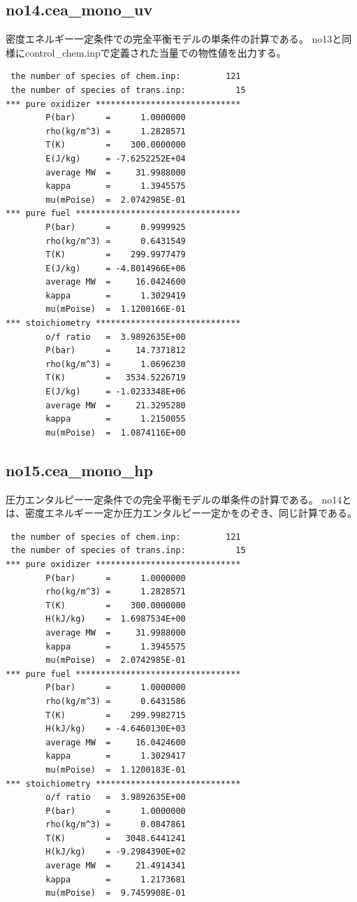 \documentclass{jsarticle}
\begin{document}
\subsection{no14.cea\_mono\_uv}%
密度エネルギー一定条件での完全平衡モデルの単条件の計算である。
no13と同様にcontrol\_chem.inpで定義された当量での物性値を出力する。
\begin{verbatim}
 the number of species of chem.inp:         121
 the number of species of trans.inp:          15
*** pure oxidizer *****************************
        P(bar)      =      1.0000000
        rho(kg/m^3) =      1.2828571
        T(K)        =    300.0000000
        E(J/kg)     = -7.6252252E+04
        average MW  =     31.9988000
        kappa       =      1.3945575
        mu(mPoise)  =  2.0742985E-01
*** pure fuel *********************************
        P(bar)      =      0.9999925
        rho(kg/m^3) =      0.6431549
        T(K)        =    299.9977479
        E(J/kg)     = -4.8014966E+06
        average MW  =     16.0424600
        kappa       =      1.3029419
        mu(mPoise)  =  1.1200166E-01
*** stoichiometry *****************************
        o/f ratio   =  3.9892635E+00
        P(bar)      =     14.7371812
        rho(kg/m^3) =      1.0696230
        T(K)        =   3534.5226719
        E(J/kg)     = -1.0233348E+06
        average MW  =     21.3295280
        kappa       =      1.2150055
        mu(mPoise)  =  1.0874116E+00
\end{verbatim}
\subsection{no15.cea\_mono\_hp}%
圧力エンタルピー一定条件での完全平衡モデルの単条件の計算である。
no14とは、密度エネルギー一定か圧力エンタルピー一定かをのぞき、同じ計算である。
\begin{verbatim}
 the number of species of chem.inp:         121
 the number of species of trans.inp:          15
*** pure oxidizer *****************************
        P(bar)      =      1.0000000
        rho(kg/m^3) =      1.2828571
        T(K)        =    300.0000000
        H(kJ/kg)    =  1.6987534E+00
        average MW  =     31.9988000
        kappa       =      1.3945575
        mu(mPoise)  =  2.0742985E-01
*** pure fuel *********************************
        P(bar)      =      1.0000000
        rho(kg/m^3) =      0.6431586
        T(K)        =    299.9982715
        H(kJ/kg)    = -4.6460130E+03
        average MW  =     16.0424600
        kappa       =      1.3029417
        mu(mPoise)  =  1.1200183E-01
*** stoichiometry *****************************
        o/f ratio   =  3.9892635E+00
        P(bar)      =      1.0000000
        rho(kg/m^3) =      0.0847861
        T(K)        =   3048.6441241
        H(kJ/kg)    = -9.2984390E+02
        average MW  =     21.4914341
        kappa       =      1.2173681
        mu(mPoise)  =  9.7459908E-01
\end{verbatim}
\end{document}

